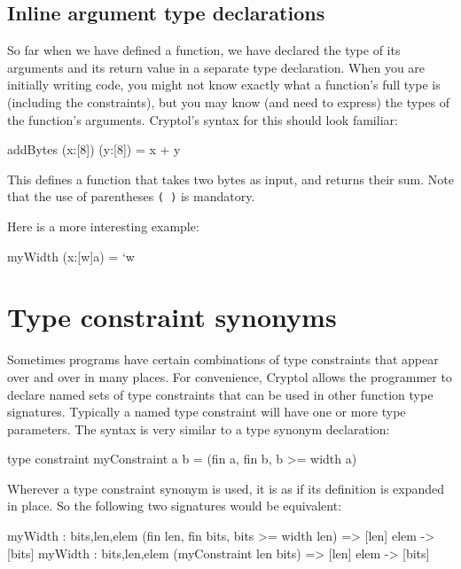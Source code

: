 \subsection{Inline argument type declarations}\indTypeInline
\label{sec:inline-argument-type}

So far when we have defined a function, we have declared the type of
its arguments and its return value in a separate type declaration.
When you are initially writing code, you might not know exactly what a
function's full type is (including the constraints), but you may know
(and need to express) the types of the function's arguments. Cryptol's
syntax for this should look familiar:
\begin{code}
  addBytes (x:[8]) (y:[8]) = x + y
\end{code}

This defines a function that takes two bytes as input, and returns their sum.
Note that the use of parentheses \texttt{( )} is mandatory.

Here is a more interesting example:
\begin{code}
  myWidth (x:[w]a) = `w
\end{code}


\section{Type constraint synonyms}

Sometimes programs have certain combinations of type constraints that
appear over and over in many places. For convenience, Cryptol allows
the programmer to declare named sets of type constraints that can be
used in other function type signatures. Typically a named type
constraint will have one or more type parameters. The syntax is very
similar to a type synonym declaration:

\begin{code}
  type constraint myConstraint a b = (fin a, fin b, b >= width a)
\end{code}

Wherever a type constraint synonym is used, it is as if its definition
is expanded in place. So the following two signatures would be
equivalent:

\begin{code}
    myWidth : {bits,len,elem} (fin len, fin bits, bits >= width len) => [len] elem -> [bits]
    myWidth : {bits,len,elem} (myConstraint len bits) => [len] elem -> [bits]
\end{code}

